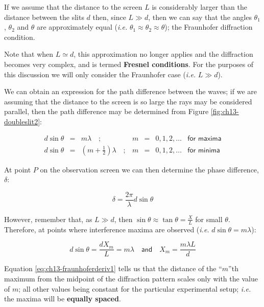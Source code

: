 \documentclass[
]{book}
\begin{document}
If we assume that the distance to the screen \(L\) is considerably larger than the distance between the slits \(d\) then, since \(L \gg d\), then we can say that the angles \(\theta_1\), \(\theta_2\) and \(\theta\) are approximately equal (\emph{i.e.} \(\theta_1 \approx \theta_2 \approx \theta\)); the Fraunhofer diffraction condition.

Note that when \(L \simeq d\), this approximation no longer applies and the diffraction becomes very complex, and is termed \textbf{Fresnel conditions}. For the purposes of this discussion we will only consider the Fraunhofer case (\emph{i.e.} \(L \gg d\)).

We can obtain an expression for the path difference between the waves; if we are assuming that the distance to the screen is so large the rays may be considered parallel, then the path difference may be determined from Figure \ref{fig:ch13-doubleslit2}:

\begin{equation}
\begin{array}{rclrcll}
d\sin\theta &=& m\lambda \quad; & m &=& 0,1,2, \dots &\textsf{for maxima} \\
d\sin\theta &=& \left(m + \frac{1}{2}\right) \lambda \quad; & m &=& 0,1,2, \dots &\textsf{for minima}
\end{array}
\end{equation}

At point \(P\) on the observation screen we can then determine the phase difference, \(\delta\):

\begin{equation}
\delta = \frac{2\pi}{\lambda}d\sin\theta
\end{equation}

However, remember that, as \(L \gg d\), then \(\sin \theta \approx \tan \theta = \frac{X}{L}\) for small \(\theta\). Therefore, at points where interference maxima are observed (\emph{i.e.} \(d\sin\theta = m\lambda\)):

\begin{equation}
d\sin\theta = \frac{d X_m}{L}= m\lambda \quad \textsf{and} \quad X_m = \frac{m\lambda L}{d}
\label{eq:ch13-fraunhoferderiv1}
\end{equation}

Equation \eqref{eq:ch13-fraunhoferderiv1} tells us that the distance of the ``\(m\)''th maximum from the midpoint of the diffraction pattern scales only with the value of \(m\); all other values being constant for the particular experimental setup; \emph{i.e.} the maxima will be \textbf{equally spaced}.
\end{document}
